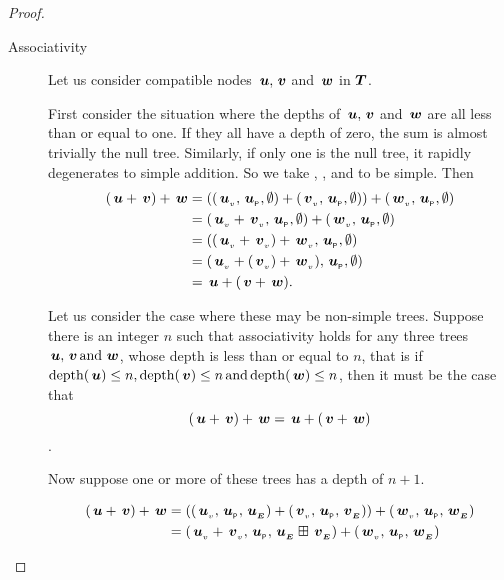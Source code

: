 \begin{proposition}
\begin{proof}
\begin{description}
    \item[Associativity]

      Let us consider compatible nodes \(\node{u}, \node{v}\) and
      \(\node{w}\) in $\DOM$. 

      First consider the situation where the depths of \(\node{u}, \node{v}\) and
      \(\node{w}\) are all less than or equal to one. If they all have
      a depth of zero, the sum is almost trivially the null
      tree. Similarly, if only one is the null tree, it rapidly
      degenerates to simple addition. So we take , ,
      and  to be simple. Then
      \begin{align*}
          (\node{u}+\node{v})+\node{w} &= ((\nv{u}, \nlabel{u}, \emptyset) + (\nv{v}, \nlabel{u}, \emptyset)) + (\nv{w}, \nlabel{u}, \emptyset) \\
          &= (\nv{u} + \nv{v}, \nlabel{u}, \emptyset) + (\nv{w}, \nlabel{u}, \emptyset) \\
          &= ((\nv{u} + \nv{v}) + \nv{w}, \nlabel{u}, \emptyset) \\
          &= (\nv{u} + (\nv{v}) + \nv{w}), \nlabel{u}, \emptyset) \\
          &= \node{u} + (\node{v} + \node{w}).
      \end{align*}
      
      Let us consider the case where these may be non-simple
      trees. Suppose there is an integer \(n\) such that associativity
      holds for any three trees \(\node{u}, \node{v} \mand \node{w}\),
      whose depth is less than or equal to \(n\), that is if
      \(\depth(\node{u}) \leq n, \depth(\node{v}) \leq n \mand
      \depth(\node{w}) \leq n\),
      then it must be the case that \[(\node{u} + \node{v}) + \node{w} = \node{u} + (\node{v} + \node{w})\].

      Now suppose one or more of these trees has a depth of
      \(n+1\).
      

      \begin{align*}
          (\node{u}+\node{v})+\node{w} &= (\Node{\nv{u}}{\nlabel{u}}{\extn{u}} + \Node{\nv{v}}{\nlabel{u}}{\extn{v}}) + \Node{\nv{w}}{\nlabel{u}}{\extn{w}} \\
          &= \Node{\nv{u} + \nv{v}}{\nlabel{u}}{\extn{u}\stplus\extn{v}} + \Node{\nv{w}}{\nlabel{u}}{\extn{w}}
      \end{align*}


\end{description}
\end{proof}
\end{proposition}
